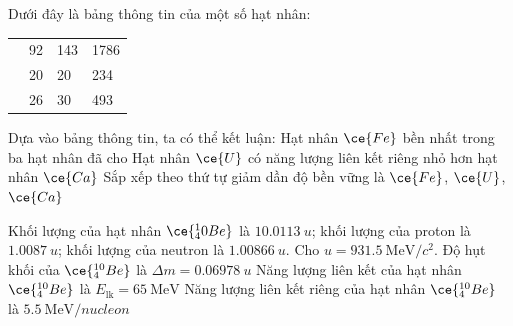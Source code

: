 \begin{ex}
	Dưới đây là bảng thông tin của một số hạt nhân:
	\begin{center}
		\begin{tabular}{|M{3cm}|M{3.5cm}|M{5cm}|M{5cm}|}
			\hline
			 &  &  & \\
			\hline
			 & 92 & 143 & 1786\\
			\hline
			 & 20 & 20 & 234\\
			\hline
			 & 26 & 30 & 493\\
			\hline
		\end{tabular}
	\end{center}
	Dựa vào bảng thông tin, ta có thể kết luận:
	{\True Hạt nhân $\ce{Fe}$ bền nhất trong ba hạt nhân đã cho}
	{Hạt nhân $\ce{U}$ có năng lượng liên kết riêng nhỏ hơn hạt nhân $\ce{Ca}$}
	{\True Sắp xếp theo thứ tự giảm dần độ bền vững là $\ce{Fe}$, $\ce{U}$, $\ce{Ca}$}
	\loigiai{}
\end{ex}
\begin{ex}
	Khối lượng của hạt nhân $\ce{_4^10Be}$ là $\SI{10.0113}{u}$; khối lượng của proton là $\SI{1.0087}{u}$; khối lượng của neutron là $\SI{1.00866}{u}$. Cho $u=\SI{931.5}{\mega\electronvolt/c^2}$.
	{\True Độ hụt khối của $\ce{^{10}_4Be}$ là $\Delta m=\SI{0.06978}{u}$}
	{\True Năng lượng liên kết của hạt nhân $\ce{^{10}_4Be}$ là $E_{\text{lk}}=\SI{65}{\mega\electronvolt}$}
	{Năng lượng liên kết riêng của hạt nhân $\ce{^{10}_4Be}$ là $\SI{5.5}{\mega\electronvolt/nucleon}$}
	\loigiai{}
\end{ex}
